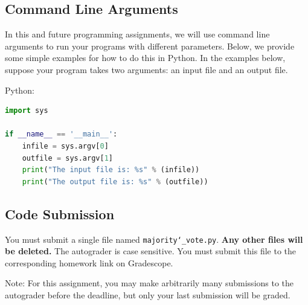 \documentclass[11pt,addpoints,answers]{exam}
\begin{document}
\subsection{Command Line Arguments}

In this and future programming assignments, we will use command line arguments to run your programs with different parameters. Below, we provide some simple examples for how to do this in Python. In the examples below, suppose your program takes two arguments: an input file and an output file.

Python:
\begin{lstlisting}[language=Python]
import sys

if __name__ == '__main__':
    infile = sys.argv[0]
    outfile = sys.argv[1]
    print("The input file is: %s" % (infile))
    print("The output file is: %s" % (outfile))
\end{lstlisting}

\subsection{Code Submission}

You must submit a single file named \texttt{majority\char`_vote.py}. \textbf{Any other files will be deleted.} The autograder is case sensitive. You must submit this file to the corresponding homework link on Gradescope.

Note: For this assignment, you may make arbitrarily many submissions to the autograder before the deadline, but only your last submission will be graded.




\clearpage\clearpage
\end{document}
